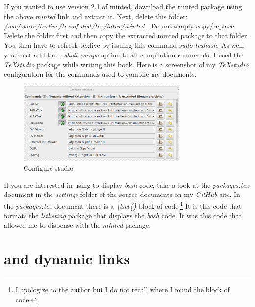 If you wanted to use version 2.1 of minted, download the minted package using the above \emph{minted} link and extract it. Next, delete this folder: \textsl{/usr/share/texlive/texmf-dist/tex/latex/minted} . Do not simply copy/replace. Delete the folder first and then copy the extracted minted package to that folder. You then have to refresh texlive by issuing this command \emph{sudo texhash}. As well, you must add the \emph{-{}-{}shell-escape} option to all \tex compilation commands. I used the \emph{TeXstudio} package while writing this book. Here is a screenshot of my \emph{TeXstudio} configuration for the commands used to compile my documents.


\begin{figure}[!h]
\centering
\includegraphics[width=0.75\textwidth]{figures/TeXstudio}
\caption{Configure \tex{}studio}
\label{ch_1_texstudio_config}
\end{figure}


If you are interested in using \latex to display \emph{bash} code, take a look at the \emph{packages.tex} document in the \textsl{settings} folder of the source documents on my \emph{GitHub} site. In the \emph{packages.tex} document there is a \emph{\textbackslash{}lset\{\}} block of code.\footnote{I apologize to the author but I do not recall where I found the block of code.} It is this code that formats the \emph{lstlisting} package that displays the \emph{bash} code. It was this code that allowed me to dispense with the \emph{minted} package.


\section{\latex and dynamic links}

